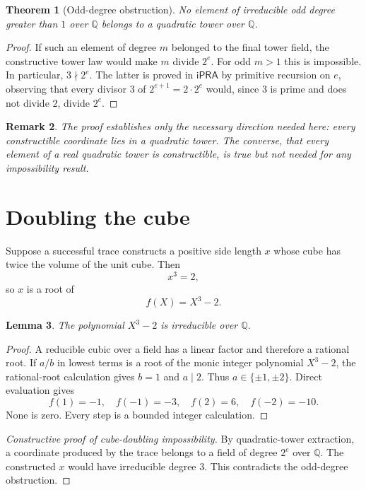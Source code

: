 \documentclass[11pt]{article}
\newtheorem{theorem}{Theorem}[section]
\newtheorem{lemma}[theorem]{Lemma}
\newtheorem{remark}[theorem]{Remark}
\newcommand{\Q}{\mathbb{Q}}
\newcommand{\ipra}{\mathsf{iPRA}}
\begin{document}
\begin{theorem}[Odd-degree obstruction]
No element of irreducible odd degree greater than $1$ over $\Q$ belongs to a quadratic tower over $\Q$.
\end{theorem}

\begin{proof}
If such an element of degree $m$ belonged to the final tower field, the constructive tower law would make $m$ divide $2^e$.  For odd $m>1$ this is impossible.  In particular, $3\nmid 2^e$.  The latter is proved in $\ipra$ by primitive recursion on $e$, observing that every divisor $3$ of $2^{e+1}=2\cdot2^e$ would, since $3$ is prime and does not divide $2$, divide $2^e$.
\end{proof}

\begin{remark}
The proof establishes only the necessary direction needed here: every constructible coordinate lies in a quadratic tower.  The converse, that every element of a real quadratic tower is constructible, is true but not needed for any impossibility result.
\end{remark}

\section{Doubling the cube}

Suppose a successful trace constructs a positive side length $x$ whose cube has twice the volume of the unit cube.  Then
\[
  x^3=2,
\]
so $x$ is a root of
\[
  f(X)=X^3-2.
\]

\begin{lemma}
The polynomial $X^3-2$ is irreducible over $\Q$.
\end{lemma}

\begin{proof}
A reducible cubic over a field has a linear factor and therefore a rational root.  If $a/b$ in lowest terms is a root of the monic integer polynomial $X^3-2$, the rational-root calculation gives $b=1$ and $a\mid2$.  Thus $a\in\{\pm1,\pm2\}$.  Direct evaluation gives
\[
  f(1)=-1,\quad f(-1)=-3,\quad f(2)=6,\quad f(-2)=-10.
\]
None is zero.  Every step is a bounded integer calculation.
\end{proof}

\begin{proof}[Constructive proof of cube-doubling impossibility]
By quadratic-tower extraction, a coordinate produced by the trace belongs to a field of degree $2^e$ over $\Q$.  The constructed $x$ would have irreducible degree $3$.  This contradicts the odd-degree obstruction.
\end{proof}
\end{document}
